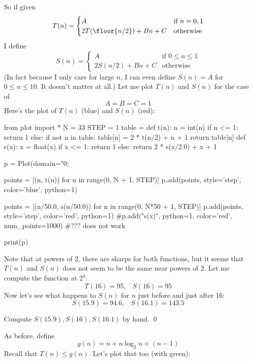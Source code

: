 So if given 
\[
T(n) 
= 
\begin{cases}
A                        & \text{if $n = 0, 1$} \\
2T(\floor{n/2}) + Bn + C & \text{otherwise}
\end{cases}
\]
I define
\[
S(n)
=
\begin{cases}
A                 & \text{if $0 \leq n \leq 1$} \\
2S(n/2) + Bn + C  & \text{otherwise}
\end{cases}
\]
(In fact because I only care for large $n$, I can even define
$S(n) = A$ for $0 \leq n \leq 10$.
It doesn't matter at all.)
Let me plot $T(n)$ and $S(n)$ for the case of
\[
A = B = C = 1
\]
Here's the plot of $T(n)$ (blue) and $S(n)$ (red):
\begin{python}
from plot import *
N = 33
STEP = 1
table = {}
def t(n):
    n = int(n)
    if n <= 1: return 1
    else:
        if not n in table:
            table[n] = 2 * t(n/2) + n + 1
        return table[n]
def s(x):
    x = float(x)
    if x <= 1: return 1
    else:
        return 2 * s(x/2.0) + x + 1

p = Plot(domain="0:%

points = [(n, t(n)) for n in range(0, N + 1, STEP)]
p.add(points, style='step', color='blue', python=1)

points = [(n/50.0, s(n/50.0)) for n in range(0, N*50 + 1, STEP)]
p.add(points, style='step', color='red', python=1)
#p.add("s(x)", python=1, color='red', num_points=1000) #??? does not work

print(p)
\end{python}

Note that at powers of $2$, there are sharps for both functions, 
but it seems that $T(n)$ and $S(n)$ does not seem to be the same
near powers of 2. Let me compute the function at $2^4$:
\[
T(16) = 95, \,\,\,\,\, S(16) = 95
\]
Now let's see what happens to $S(n)$ for $n$ just before and just after 16:
\[
S(15.9) = 94.6, \,\,\,\,\, S(16.1) = 143.5 
\]


\begin{ex}
Compute $S(15.9), S(16), S(16.1)$ by hand.
\qed
\end{ex}


As before, define
\[
g(n) = n + n \log_2 n + (n - 1)
\]
Recall that $T(n) \leq g(n)$.
Let's plot that too (with green):

